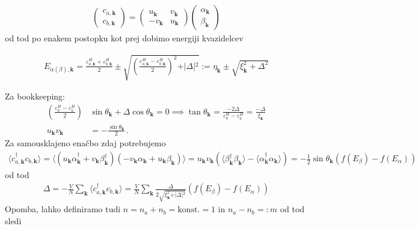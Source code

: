 \documentclass[a4paper,10pt]{article}
\renewcommand{\vec}[1]{\mathbf{#1}}
\begin{document}
\begin{align} \label{EI_uintana_rotacija}
  \begin{pmatrix} c_{a,\vec{k}} \\ c_{b,\vec{k}} \end{pmatrix} = \begin{pmatrix} u_{\vec{k}} & v_{\vec{k}} \\ -v_{\vec{k}} & u_{\vec{k}} \end{pmatrix} \begin{pmatrix} \alpha_{\vec{k}} \\ \beta_{\vec{k}} \end{pmatrix}
\end{align}
od tod po enakem postopku kot prej dobimo energiji kvazidelcev
\begin{tcolorbox}
\begin{align}
E_{\alpha(\beta), \vec{k}} = \frac{{\varepsilon}^H_{a,\vec{k}} + {\varepsilon}^H_{b,\vec{k}}}{2} \pm \sqrt{\left(\frac{{\varepsilon}^H_{a,\vec{k}} - {\varepsilon}^H_{b,\vec{k}}}{2}\right)^2 + \vert{}\Delta\vert{}^2} := \eta_{\vec{k}} \pm \sqrt{\xi_{\vec{k}}^2 +\Delta^2}
\end{align}
\end{tcolorbox}
Za bookkeeping: 
\begin{align}
  \left( \frac{\varepsilon_a^H - \varepsilon_b^H}{2} \right)& \sin \theta_{\vec{k}} + \Delta \cos \theta_{\vec{k}} = 0 \implies \tan \theta_{\vec{k}} = \frac{-2 \Delta}{\varepsilon_a^H - \varepsilon_b^H} = \frac{-\Delta}{\xi_{\vec{k}}}\\
  u_{\vec{k}} v_{\vec{k}} &= -\frac{\sin \theta_{\vec{k}}}{2}\,.
\end{align}
Za samousklajeno enačbo zdaj potrebujemo
\begin{align}
  \langle c_{a,\vec{k}}^\dagger c_{b,\vec{k}} \rangle = \langle (u_{\vec{k}} \alpha_{\vec{k}}^\dagger + v_{\vec{k}} \beta_{\vec{k}}^\dagger)(-v_{\vec{k}} \alpha_{\vec{k}} + u_{\vec{k}} \beta_{\vec{k}}) \rangle = u_{\vec{k}} v_{\vec{k}} \left( \langle \beta_{\vec{k}}^\dagger \beta_{\vec{k}} \rangle - \langle \alpha_{\vec{k}}^\dagger \alpha_{\vec{k}} \rangle \right) = -\frac{1}{2} \sin\theta_{\vec{k}} (f(E_{\beta}) - f(E_{\alpha}))
\end{align}
od tod
\begin{align}
  \Delta = -\frac{V}{N}\sum_{\vec{k}} \langle c_{a,\vec{k}}^\dagger c_{b,\vec{k}} \rangle = \frac{V}{N} \sum_{\vec{k}} \frac{ \Delta}{2\sqrt{\xi_{\vec{k}}^2 + \vert{}\Delta\vert{}^2}} (f(E_{\beta}) - f(E_{\alpha}))
\end{align}
Opomba, lahko definiramo tudi $n = n_a + n_b = \text{konst.} = 1$ in $n_a-n_b =: m$ od tod sledi
\end{document}

